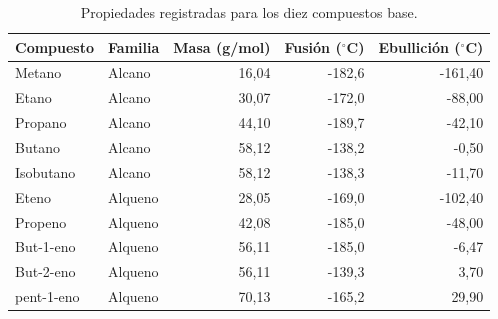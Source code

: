 \begin{table}[!t]
\centering
\begin{threeparttable}
\caption{Propiedades registradas para los diez compuestos base.}
\label{tab:compuestos}
\footnotesize
\begin{tabular}{llrrr}
\toprule
Compuesto & Familia & Masa (g/mol) & Fusión ($^\circ$C) & Ebullición ($^\circ$C) \\
\midrule
Metano & Alcano & 16,04 & -182,6 & -161,40 \\
Etano & Alcano & 30,07 & -172,0 & -88,00 \\
Propano & Alcano & 44,10 & -189,7 & -42,10 \\
Butano & Alcano & 58,12 & -138,2 & -0,50 \\
Isobutano & Alcano & 58,12 & -138,3 & -11,70 \\
Eteno & Alqueno & 28,05 & -169,0 & -102,40 \\
Propeno & Alqueno & 42,08 & -185,0 & -48,00 \\
But-1-eno & Alqueno & 56,11 & -185,0 & -6,47 \\
But-2-eno & Alqueno & 56,11 & -139,3 & 3,70 \\
pent-1-eno & Alqueno & 70,13 & -165,2 & 29,90 \\
\bottomrule
\end{tabular}
\begin{tablenotes}

\end{tablenotes}
\end{threeparttable}
\end{table}
